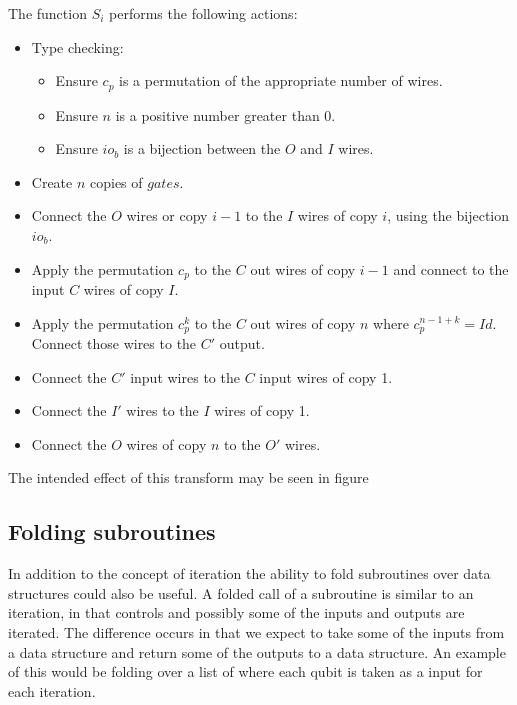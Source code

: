 The function $S_i$ performs the following actions:
\begin{itemize}
  \item Type checking:
  \begin{itemize}
    \item Ensure  $c_p$ is a permutation of the appropriate number of wires.
    \item Ensure $n$ is a positive number greater than 0.
    \item Ensure $io_b$ is a bijection between the $O$ and $I$ wires.
  \end{itemize}
  \item Create $n$ copies of $gates$.
  \item Connect the $O$ wires or copy $i-1$ to the $I$ wires of copy $i$,
  using the bijection $io_b$.
  \item Apply the permutation $c_p$ to the $C$ out wires of copy $i-1$
  and connect to the input $C$ wires of copy $I$.
  \item Apply the permutation $c_p^k$ to the $C$ out wires of copy $n$
  where $c_p^{n-1+k} = Id$. Connect those wires to the $C'$ output.
  \item Connect the $C'$ input wires to the $C$ input wires of copy 1.
  \item Connect the $I'$ wires to the $I$ wires of copy 1.
  \item Connect the $O$ wires of copy $n$ to the $O'$ wires.
\end{itemize}

The intended effect of this transform may be seen in figure
\begin{figure}[htbp]
\end{figure}

\subsection{Folding subroutines} %
\label{sub:folding_subroutines}

In addition to the concept of iteration the ability to fold
subroutines over data structures could also be useful. A
folded call of a subroutine is similar to an iteration, in
that controls and possibly some of the inputs
and outputs are iterated. The difference occurs in that we
expect to take some of the inputs from a data structure and
return some of the outputs to a data structure. An example of
this would be folding over a list of  where
each qubit is taken as a input for each iteration.

